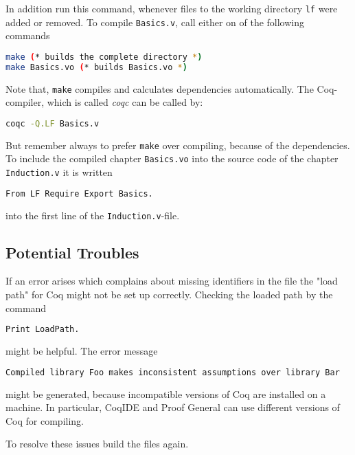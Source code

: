 In addition run this command, whenever files to the working directory \texttt{lf} were added or removed.
To compile \texttt{Basics.v}, call either on of the following commands 
\begin{lstlisting}[language=bash, caption = \lstinline!make!, label = lst:make]
make (* builds the complete directory *)
make Basics.vo (* builds Basics.vo *)
\end{lstlisting}
Note that, \lstinline!make! compiles and calculates dependencies automatically. 
The Coq-compiler, which is called {\itshape coqc} can be called by: 
\begin{lstlisting}[language=bash, caption =\lstinline!coqc!, label = lst:coqc]
coqc -Q.LF Basics.v
\end{lstlisting}
But remember always to prefer \texttt{make} over compiling, because of the dependencies.\\
 
To include the compiled chapter \texttt{Basics.vo} into the source code of the chapter \texttt{Induction.v} it is written
\begin{lstlisting}[language = bash, caption = \lstinline!Require Export!, label = lst:RequireExport]
From LF Require Export Basics.
\end{lstlisting}
into the first line of the \texttt{Induction.v}-file.

 

\subsection{Potential Troubles}

If an error arises which complains about missing identifiers in the file the "load path" for Coq might not be set up correctly.
Checking the loaded path by the command
\begin{lstlisting}[language = bash, caption = checking the loaded path, label = lst:PrintLoadPath]
Print LoadPath.  
\end{lstlisting} 
might be helpful. The error message
\begin{lstlisting}[language = bash, caption = possible  version error, label = lst:possibleVersionError ]
  Compiled library Foo makes inconsistent assumptions over library Bar
\end{lstlisting}
might be generated, because incompatible versions of Coq are installed on a machine.
In particular,  CoqIDE and Proof General can use different versions of Coq for compiling. 

To resolve these issues build the files again.\\

